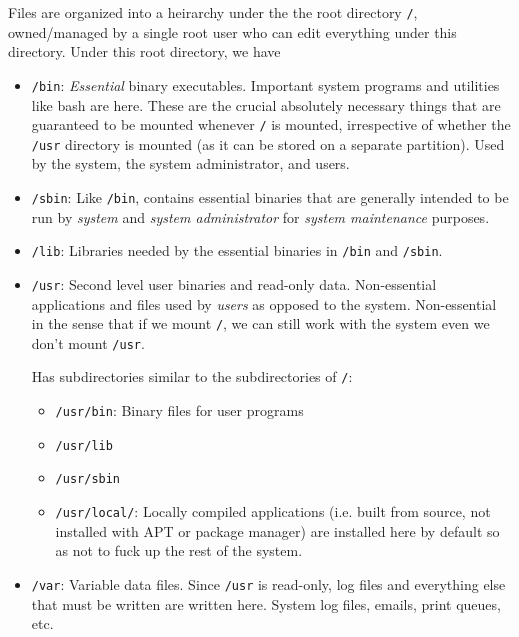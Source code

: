 \documentclass[12pt]{article}
\theoremstyle{plain}
\theoremstyle{definition}
\theoremstyle{remark}
\begin{document}
Files are organized into a heirarchy under the the root directory
\texttt{/}, owned/managed by a single root user who can edit everything
under this directory.
Under this root directory, we have
\begin{itemize}
  \item \texttt{/bin}: \emph{Essential} binary executables.
    Important system programs and utilities like bash are
    here.
    These are the crucial absolutely necessary things that are
    guaranteed to be mounted whenever \texttt{/} is mounted,
    irrespective of whether the \texttt{/usr} directory is mounted (as
    it can be stored on a separate partition).
    Used by the system, the system administrator, and users.

  \item \texttt{/sbin}: Like \texttt{/bin}, contains essential binaries
    that are generally intended to be run by \emph{system} and
    \emph{system administrator} for \emph{system maintenance} purposes.

  \item \texttt{/lib}:
    Libraries needed by the essential binaries in \texttt{/bin} and
    \texttt{/sbin}.

  \item \texttt{/usr}:
    Second level user binaries and read-only data.
    Non-essential applications and files used by \emph{users} as opposed
    to the system. Non-essential in the sense that if we mount
    \texttt{/}, we can still work with the system even we don't mount
    \texttt{/usr}.


    Has subdirectories similar to the subdirectories of \texttt{/}:
    \begin{itemize}
      \item \texttt{/usr/bin}:
        Binary files for user programs
      \item \texttt{/usr/lib}
      \item \texttt{/usr/sbin}
      \item \texttt{/usr/local/}:
        Locally compiled applications (i.e. built from source, not
        installed with APT or package manager) are installed here by
        default so as not to fuck up the rest of the system.
    \end{itemize}
  \item \texttt{/var}:
    Variable data files.
    Since \texttt{/usr} is read-only, log files and everything else that
    must be written are written here.
    System log files, emails, print queues, etc.



\end{itemize}
\end{document}
